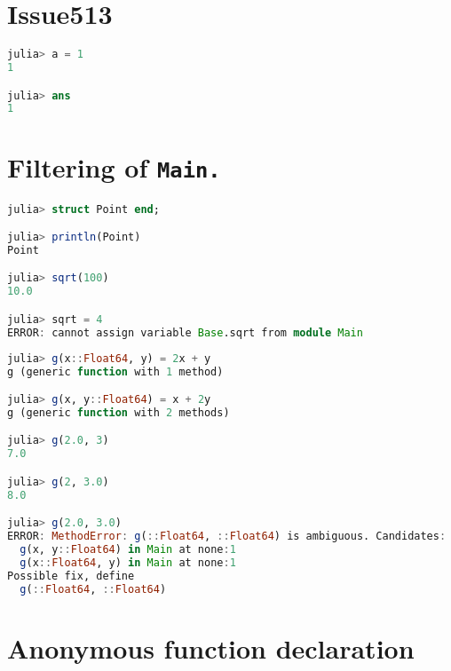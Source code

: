 \chapter{Issue513}



\label{18320015255820629047}{}



\begin{lstlisting}[language=julia, style=jlcodestyle]
julia> a = 1
1

julia> ans
1
\end{lstlisting}



\chapter{Filtering of \texttt{Main.}}



\label{11837074900083153011}{}



\begin{lstlisting}[language=julia, style=jlcodestyle]
julia> struct Point end;

julia> println(Point)
Point

julia> sqrt(100)
10.0

julia> sqrt = 4
ERROR: cannot assign variable Base.sqrt from module Main
\end{lstlisting}




\begin{lstlisting}[language=julia, style=jlcodestyle]
julia> g(x::Float64, y) = 2x + y
g (generic function with 1 method)

julia> g(x, y::Float64) = x + 2y
g (generic function with 2 methods)

julia> g(2.0, 3)
7.0

julia> g(2, 3.0)
8.0

julia> g(2.0, 3.0)
ERROR: MethodError: g(::Float64, ::Float64) is ambiguous. Candidates:
  g(x, y::Float64) in Main at none:1
  g(x::Float64, y) in Main at none:1
Possible fix, define
  g(::Float64, ::Float64)
\end{lstlisting}



\chapter{Anonymous function declaration}



